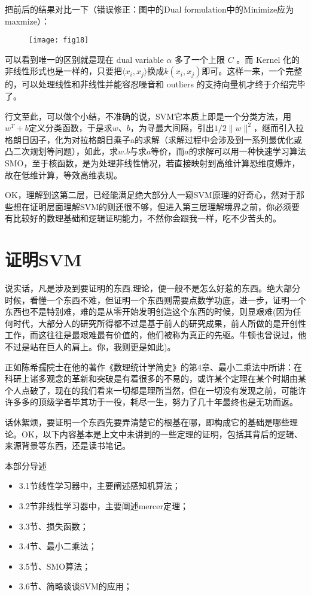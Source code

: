 \documentclass[a4paper,12pt]{article}
\begin{document}
把前后的结果对比一下（错误修正：图中的Dual formulation中的Minimize应为maxmize）：

\begin{figure}[H]
  \centering
  \texttt{[image: fig18]}
\end{figure}

可以看到唯一的区别就是现在 dual variable $\alpha$ 多了一个上限 $C$ 。而 Kernel 化的非线性形式也是一样的，只要把$\langle x_i,x_j\rangle$换成$k(x_i,x_j)$即可。这样一来，一个完整的，可以处理线性和非线性并能容忍噪音和 outliers 的支持向量机才终于介绍完毕了。

行文至此，可以做个小结，不准确的说，SVM它本质上即是一个分类方法，用$w^T+b$定义分类函数，于是求$w$、$b$，为寻最大间隔，引出$1/2\|w\|^2$，继而引入拉格朗日因子，化为对拉格朗日乘子a的求解（求解过程中会涉及到一系列最优化或凸二次规划等问题），如此，求$w.b$与求$a$等价，而$a$的求解可以用一种快速学习算法SMO，至于核函数，是为处理非线性情况，若直接映射到高维计算恐维度爆炸，故在低维计算，等效高维表现。

OK，理解到这第二层，已经能满足绝大部分人一窥SVM原理的好奇心，然对于那些想在证明层面理解SVM的则还很不够，但进入第三层理解境界之前，你必须要有比较好的数理基础和逻辑证明能力，不然你会跟我一样，吃不少苦头的。

\section{证明SVM}
说实话，凡是涉及到要证明的东西.理论，便一般不是怎么好惹的东西。绝大部分时候，看懂一个东西不难，但证明一个东西则需要点数学功底，进一步，证明一个东西也不是特别难，难的是从零开始发明创造这个东西的时候，则显艰难(因为任何时代，大部分人的研究所得都不过是基于前人的研究成果，前人所做的是开创性工作，而这往往是最艰难最有价值的，他们被称为真正的先驱。牛顿也曾说过，他不过是站在巨人的肩上。你，我则更是如此)。

正如陈希孺院士在他的著作《数理统计学简史》的第4章、最小二乘法中所讲：在科研上诸多观念的革新和突破是有着很多的不易的，或许某个定理在某个时期由某个人点破了，现在的我们看来一切都是理所当然，但在一切没有发现之前，可能许许多多的顶级学者毕其功于一役，耗尽一生，努力了几十年最终也是无功而返。

话休絮烦，要证明一个东西先要弄清楚它的根基在哪，即构成它的基础是哪些理论。OK，以下内容基本是上文中未讲到的一些定理的证明，包括其背后的逻辑、来源背景等东西，还是读书笔记。

本部分导述

\begin{itemize}
  \item    3.1节线性学习器中，主要阐述感知机算法；
  \item    3.2节非线性学习器中，主要阐述mercer定理；
  \item    3.3节、损失函数；
  \item    3.4节、最小二乘法；
  \item    3.5节、SMO算法；
  \item    3.6节、简略谈谈SVM的应用；
\end{itemize}
\end{document}
